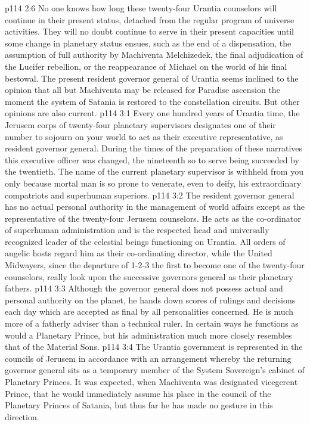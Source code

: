 \vs p114 2:6 No one knows how long these twenty\hyp{}four Urantia counselors will continue in their present status, detached from the regular program of universe activities. They will no doubt continue to serve in their present capacities until some change in planetary status ensues, such as the end of a dispensation, the assumption of full authority by Machiventa Melchizedek, the final adjudication of the Lucifer rebellion, or the reappearance of Michael on the world of his final bestowal. The present resident governor general of Urantia seems inclined to the opinion that all but Machiventa may be released for Paradise ascension the moment the system of Satania is restored to the constellation circuits. But other opinions are also current.\plusone
{}
\vs p114 3:1 Every one hundred years of Urantia time, the Jerusem corps of twenty\hyp{}four planetary supervisors designates one of their number to sojourn on your world to act as their executive representative, as resident governor general. During the times of the preparation of these narratives this executive officer was changed, the nineteenth so to serve being succeeded by the twentieth. The name of the current planetary supervisor is withheld from you only because mortal man is so prone to venerate, even to deify, his extraordinary compatriots and superhuman superiors.\plusone
\vs p114 3:2 The resident governor general has no actual personal authority in the management of world affairs except as the representative of the twenty\hyp{}four Jerusem counselors. He acts as the co\hyp{}ordinator of superhuman administration and is the respected head and universally recognized leader of the celestial beings functioning on Urantia. All orders of angelic hosts regard him as their co\hyp{}ordinating director, while the United Midwayers, since the departure of 1\hyp{}2\hyp{}3 the first to become one of the twenty\hyp{}four counselors, really look upon the successive governors general as their planetary fathers.
\vs p114 3:3 Although the governor general does not possess actual and personal authority on the planet, he hands down scores of rulings and decisions each day which are accepted as final by all personalities concerned. He is much more of a fatherly adviser than a technical ruler. In certain ways he functions as would a Planetary Prince, but his administration much more closely resembles that of the Material Sons.
\pc \vs p114 3:4 The Urantia government is represented in the councils of Jerusem in accordance with an arrangement whereby the returning governor general sits as a temporary member of the System Sovereign’s cabinet of Planetary Princes. It was expected, when Machiventa was designated vicegerent Prince, that he would immediately assume his place in the council of the Planetary Princes of Satania, but thus far he has made no gesture in this direction.
